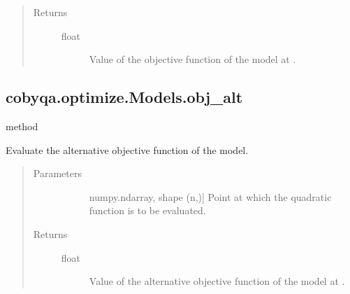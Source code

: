 \documentclass[letterpaper,10pt,english]{sphinxmanual}
\begin{document}
\begin{fulllineitems}
\begin{fulllineitems}
\begin{quote}
\begin{description}
\begin{description}
\end{description}

\item[{Returns}] \leavevmode\begin{description}
\item[{float}] \leavevmode
\sphinxAtStartPar
Value of the objective function of the model at .

\end{description}

\end{description}\end{quote}

\end{fulllineitems}



\subsection{cobyqa.optimize.Models.obj\_alt}
\label{\detokenize{refs/generated/cobyqa.optimize.Models.obj_alt:cobyqa-optimize-models-obj-alt}}\label{\detokenize{refs/generated/cobyqa.optimize.Models.obj_alt::doc}}
\sphinxAtStartPar
method

\begin{fulllineitems}
\label{\detokenize{refs/generated/cobyqa.optimize.Models.obj_alt:cobyqa.optimize.Models.obj_alt}}
\sphinxAtStartPar
Evaluate the alternative objective function of the model.
\begin{quote}\begin{description}
\item[{Parameters}] \leavevmode\begin{description}
\item[{}] \leavevmode{[}numpy.ndarray, shape (n,){]}
\sphinxAtStartPar
Point at which the quadratic function is to be evaluated.

\end{description}

\item[{Returns}] \leavevmode\begin{description}
\item[{float}] \leavevmode
\sphinxAtStartPar
Value of the alternative objective function of the model at .


\end{description}
\end{description}
\end{quote}
\end{fulllineitems}
\end{fulllineitems}
\end{document}
